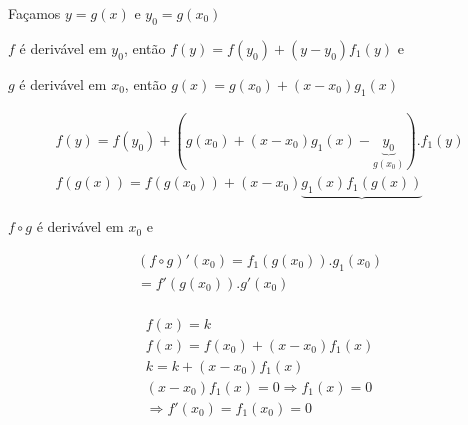 \documentclass{book}
\begin{document}
\begin{dem}

Fa\c camos $y = g\left( x \right)$ e $y_0 = g\left( {x_0 } \right)$

$f$ \'{e} deriv\'avel em $y_0 $, ent\~ao $f\left( y \right) = f\left( {y_0
} \right) + \left( {y - y_0 } \right)f_1 \left( y \right)$ e

$g$ \'{e} deriv\'avel em $x_0 $, ent\~ao $g\left( x \right) = g\left( {x_0
} \right) + \left( {x - x_0 } \right)g_1 \left( x \right)$

\begin{eqnarray*}
f\left( y \right) = f\left( {y_0 } \right) + \left( {g\left( {x_0 } \right)
+ \left( {x - x_0 } \right)g_1 \left( x \right) - \underbrace {y_0
}_{g\left( {x_0 } \right)}} \right).f_1 \left( y \right) \\
f\left( {g\left( x \right)} \right) = f\left( {g\left( {x_0 } \right)}
\right) + \left( {x - x_0 } \right)\underbrace {g_1 \left( x \right)f_1
\left( {g\left( x \right)} \right)}
\end{eqnarray*}

$f \circ g$ \'{e} deriv\'avel em $x_0 $ e

\[
\begin{array}{l}
\left( {f \circ g} \right)'\left( {x_0 } \right) = f_1 \left( {g\left( {x_0
} \right)} \right).g_1 \left( {x_0 } \right) \\
= f'\left( {g\left( {x_0 } \right)} \right).g'\left( {x_0 } \right) \\
\end{array}
\]

\end{dem}

\begin{ex}

\[
\begin{array}{l}
f\left( x \right) = k \\
f\left( x \right) = f\left( {x_0 } \right) + \left( {x - x_0 } \right)f_1
\left( x \right) \\
k = k + \left( {x - x_0 } \right)f_1 \left( x \right) \\
\left( {x - x_0 } \right)f_1 \left( x \right) = 0 \Rightarrow f_1 \left( x
\right) = 0 \\
\Rightarrow f'\left( {x_0 } \right) = f_1 \left( {x_0 } \right) = 0 \\
\end{array}
\]

\end{ex}
\end{document}
